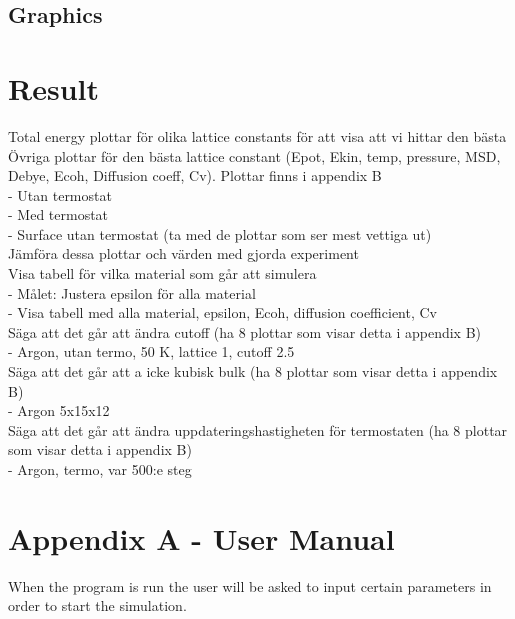 \documentclass[12pt,a4paper]{article}
\begin{document}
\subsection{Graphics}

\newpage
\section{Result}
\label{sec:Result}

Total energy plottar för olika lattice constants för att visa att vi hittar den bästa\\
Övriga plottar för den bästa lattice constant (Epot, Ekin, temp, pressure, MSD, Debye, Ecoh, Diffusion coeff, Cv). Plottar finns i appendix B\\
	- Utan termostat\\
	- Med termostat\\
	- Surface utan termostat (ta med de plottar som ser mest vettiga ut)\\
Jämföra dessa plottar och värden med gjorda experiment\\
Visa tabell för vilka material som går att simulera\\
	- Målet: Justera epsilon för alla material\\
	- Visa tabell med alla material, epsilon, Ecoh, diffusion coefficient, Cv\\
Säga att det går att ändra cutoff (ha 8 plottar som visar detta i appendix B)\\
	- Argon, utan termo, 50 K, lattice 1, cutoff 2.5\\
Säga att det går att a icke kubisk bulk (ha 8 plottar som visar detta i appendix B)\\
	- Argon 5x15x12\\
Säga att det går att ändra uppdateringshastigheten för termostaten (ha 8 plottar som visar detta i appendix B)\\
	- Argon, termo, var 500:e steg\\

\newpage

\section*{Appendix A - User Manual}

\label{sec:AppendixA}
When the program is run the user will be asked to input certain parameters in order to start the simulation.
\end{document}

